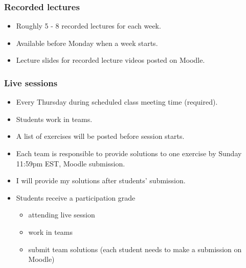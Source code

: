 \documentclass[slidestop,compress,mathserif]{beamer}
\begin{document}
\begin{frame}
\frametitle{Recorded lectures}

\begin{itemize}
\item Roughly 5 - 8 recorded lectures for each week.

\item Available before Monday when a week starts.

\item Lecture slides for recorded lecture videos posted on Moodle.
\end{itemize}

\end{frame}


\begin{frame}
\frametitle{Live sessions}

\begin{itemize}
\item Every Thursday during scheduled class meeting time (required).

\item Students work in teams.

\item A list of exercises will be posted before session starts.

\item Each team is responsible to provide solutions to one exercise by Sunday 11:59pm EST, Moodle submission.

\item I will provide my solutions after students' submission.

\item Students receive a participation grade
	\begin{itemize}
	\item attending live session
	\item work in teams
	\item submit team solutions (each student needs to make a submission on Moodle)
	\end{itemize}
\end{itemize}
\end{frame}
%
\end{document}
